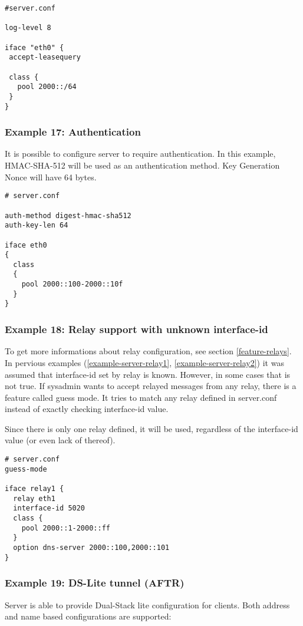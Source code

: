 \begin{lstlisting}
#server.conf

log-level 8

iface "eth0" {
 accept-leasequery

 class {
   pool 2000::/64
 }
}
\end{lstlisting}


\subsubsection{Example 17: Authentication}
\label{example-server-auth}
It is possible to configure server to require authentication. In this
example, HMAC-SHA-512 will be used as an authentication method.
Key Generation Nonce will have 64 bytes.

\begin{lstlisting}
# server.conf

auth-method digest-hmac-sha512
auth-key-len 64

iface eth0
{
  class
  {
    pool 2000::100-2000::10f
  }
}
\end{lstlisting}

\subsubsection{Example 18: Relay support with unknown interface-id}
\label{example-server-relay3}
To get more informations about relay configuration, see section \ref{feature-relays}.
In pervious examples (\ref{example-server-relay1},
\ref{example-server-relay2}) it was assumed that interface-id set by
relay is known. However, in some cases that is not true. If sysadmin
wants to accept relayed messages from any relay, there is a feature
called guess mode. It tries to match any relay defined in server.conf
instead of exactly checking interface-id value.

Since there is only one relay defined, it will be used, regardless of
the interface-id value (or even lack of thereof).

\begin{lstlisting}
# server.conf
guess-mode

iface relay1 {
  relay eth1
  interface-id 5020
  class {
    pool 2000::1-2000::ff
  }
  option dns-server 2000::100,2000::101
}
\end{lstlisting}


\subsubsection{Example 19: DS-Lite tunnel (AFTR)}
Server is able to provide Dual-Stack lite configuration for clients.
Both address and name based configurations are supported:

